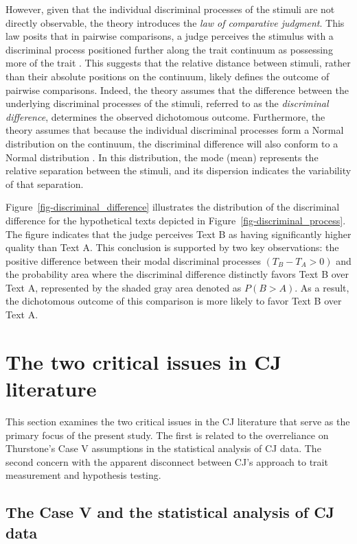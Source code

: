 \documentclass[
  authoryear,
  review,
  1p]{elsarticle}
\begin{document}
However, given that the individual discriminal processes of the stimuli
are not directly observable, the theory introduces the \emph{law of
comparative judgment}. This law posits that in pairwise comparisons, a
judge perceives the stimulus with a discriminal process positioned
further along the trait continuum as possessing more of the trait
\citep[pp.~251]{Bramley_2008}. This suggests that the relative distance
between stimuli, rather than their absolute positions on the continuum,
likely defines the outcome of pairwise comparisons. Indeed, the theory
assumes that the difference between the underlying discriminal processes
of the stimuli, referred to as the \emph{discriminal difference},
determines the observed dichotomous outcome. Furthermore, the theory
assumes that because the individual discriminal processes form a Normal
distribution on the continuum, the discriminal difference will also
conform to a Normal distribution \citep{Andrich_1978}. In this
distribution, the mode (mean) represents the relative separation between
the stimuli, and its dispersion indicates the variability of that
separation.

Figure~\ref{fig-discriminal_difference} illustrates the distribution of
the discriminal difference for the hypothetical texts depicted in
Figure~\ref{fig-discriminal_process}. The figure indicates that the
judge perceives Text B as having significantly higher quality than Text
A. This conclusion is supported by two key observations: the positive
difference between their modal discriminal processes
\((T_{B} - T_{A} > 0)\) and the probability area where the discriminal
difference distinctly favors Text B over Text A, represented by the
shaded gray area denoted as \(P(B > A)\). As a result, the dichotomous
outcome of this comparison is more likely to favor Text B over Text A.

\section{The two critical issues in CJ
literature}\label{sec-theory-issues}

This section examines the two critical issues in the CJ literature that
serve as the primary focus of the present study. The first is related to
the overreliance on Thurstone's Case V assumptions in the statistical
analysis of CJ data. The second concern with the apparent disconnect
between CJ's approach to trait measurement and hypothesis testing.

\subsection{The Case V and the statistical analysis of CJ
data}\label{sec-theory-issue1}
\end{document}
